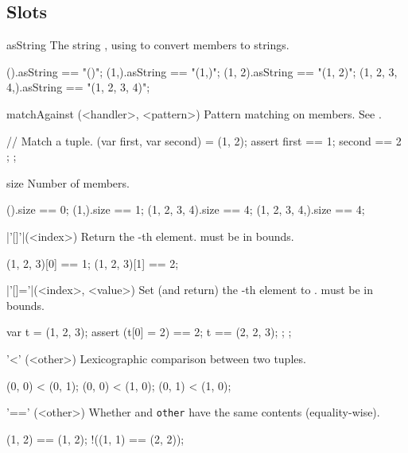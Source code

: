 \subsection{Slots}
\begin{urbiscriptapi}
\item[asString]%
  The string , using
   to convert members to strings.

\begin{urbiassert}
           ().asString == "()";
         (1,).asString == "(1,)";
       (1, 2).asString == "(1, 2)";
(1, 2, 3, 4,).asString == "(1, 2, 3, 4)";
\end{urbiassert}


\item[matchAgainst](<handler>, <pattern>)%
  Pattern matching on members.  See .
\begin{urbiscript}
{
  // Match a tuple.
  (var first, var second) = (1, 2);
  assert { first == 1; second == 2 };
};
\end{urbiscript}

\item[size] Number of members.
\begin{urbiassert}
           ().size == 0;
         (1,).size == 1;
 (1, 2, 3, 4).size == 4;
(1, 2, 3, 4,).size == 4;
\end{urbiassert}

\item|'[]'|(<index>)%
  Return the -th element.   must be in bounds.
\begin{urbiassert}
(1, 2, 3)[0] == 1;
(1, 2, 3)[1] == 2;
\end{urbiassert}

\item|'[]='|(<index>, <value>)%
  Set (and return) the -th element to .
   must be in bounds.
\begin{urbiscript}
{
  var t = (1, 2, 3);
  assert
  {
    (t[0] = 2) == 2;
    t == (2, 2, 3);
  };
};
\end{urbiscript}

\item['<'](<other>)%
  Lexicographic comparison between two tuples.
\begin{urbiassert}
(0, 0) < (0, 1);
(0, 0) < (1, 0);
(0, 1) < (1, 0);
\end{urbiassert}

\item['=='](<other>)%
  Whether \this and \lstinline|other| have the same contents
  (equality-wise).
\begin{urbiassert}
  (1, 2) == (1, 2);
!((1, 1) == (2, 2));
\end{urbiassert}


\end{urbiscriptapi}
